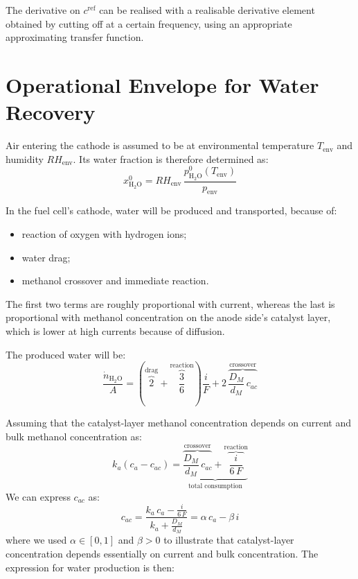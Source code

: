 \documentclass[a4paper,10pt]{article}
\newcommand{\HHO}{\ensuremath{\mathrm{H_2O}}}
\begin{document}
The derivative on $c^\text{ref}$ can be realised with a realisable derivative
element obtained by cutting off at a certain frequency, using an appropriate
approximating transfer function.



\pagebreak
\section{Operational Envelope for Water Recovery}
Air entering the cathode is assumed to be at environmental temperature
$T_\text{env}$ and humidity $RH_\text{env}$. Its water fraction is therefore
determined as:
\begin{equation}
x_\HHO^0 = RH_\text{env}\,\frac{p_\HHO^0(T_\text{env})}{p_\text{env}}
\end{equation}

In the fuel cell's cathode, water will be produced and transported, because of:
\begin{itemize}
\item reaction of oxygen with hydrogen ions;
\item water drag;
\item methanol crossover and immediate reaction.
\end{itemize}

The first two terms are roughly proportional with current, whereas the last is
proportional with methanol concentration on the anode side's catalyst layer,
which is lower at high currents because of diffusion.

The produced water will be:
\begin{equation}
\frac{\dot n_\HHO}{A} = \left( \overbrace{2}^\text{drag} +
\overbrace{\frac{3}{6}}^\text{reaction} \right) \frac{i}{F} +
2\,\overbrace{\frac{D_M}{d_M}\,c_{ac}}^\text{crossover}
\end{equation}

Assuming that the catalyst-layer methanol concentration depends on current and
bulk methanol concentration as:
\begin{equation}
k_a(c_a-c_{ac}) = \underbrace{
\overbrace{\frac{D_M}{d_M}\,c_{ac}}^\text{crossover} +
\overbrace{\frac{i}{6\,F}}^\text{reaction}
}_\text{total consumption}
\end{equation}
We can express $c_{ac}$ as:
\begin{equation}
c_{ac} = \frac{k_a\,c_a - \frac{i}{6\,F}}{k_a+\frac{D_M}{d_M}}
= \alpha \, c_a - \beta \,i
\end{equation}
where we used $\alpha \in [0,1]$ and $\beta>0$ to illustrate that catalyst-layer
concentration depends essentially on current and bulk concentration.
The expression for water production is then:
\end{document}
